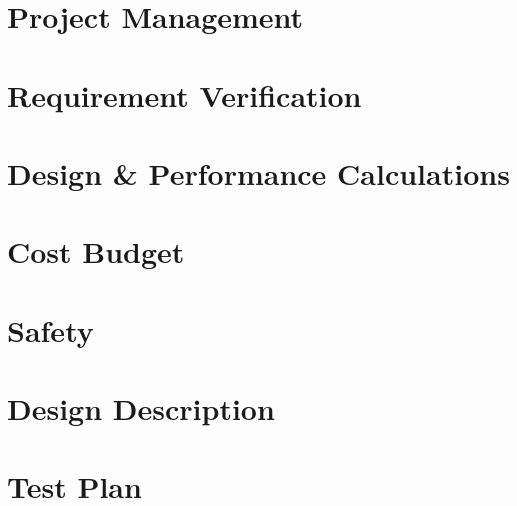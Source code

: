 \documentclass[10pt, a4paper]{article}
\begin{document}
\section{Project Management} %

\newpage

\section{Requirement Verification} %

\newpage

\section{Design \& Performance Calculations} %

\newpage

\section{Cost Budget} %

\newpage

\section{Safety} %

\newpage

\section{Design Description} %

\newpage

\section{Test Plan} %

\newpage


\end{document}
